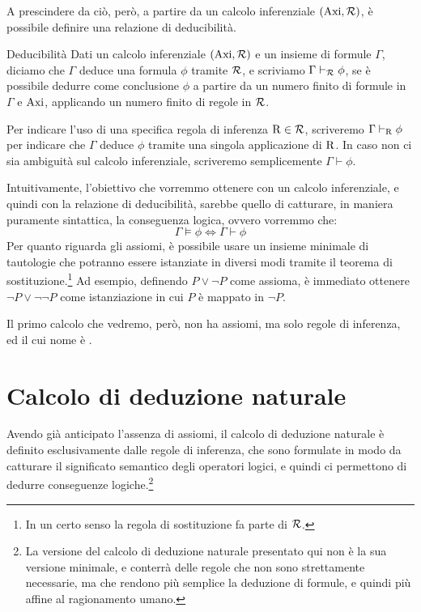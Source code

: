 A prescindere da ciò, però, a partire da un calcolo inferenziale \((\operatorname{Axi}, \mathcal{R})\), è possibile definire una relazione di deducibilità.

\begin{definition}[namedlabel={def:deducibility}{Deducibilità}]{Deducibilità}
  Dati un calcolo inferenziale \((\operatorname{Axi}, \mathcal{R})\) e un insieme di formule \(\Gamma\), diciamo che \(\Gamma\) deduce una formula \(\phi\) tramite \(\mathcal{R}\), e scriviamo \(\Gamma \vdash_{\mathcal{R}} \phi\), se è possibile dedurre come conclusione \(\phi\) a partire da un numero finito di formule in \(\Gamma\) e \(\operatorname{Axi}\), applicando un numero finito di regole in \(\mathcal{R}\).

  Per indicare l'uso di una specifica regola di inferenza \(\operatorname{R} \in \mathcal{R}\), scriveremo \(\Gamma \vdash_{\operatorname{R}} \phi\) per indicare che \(\Gamma\) deduce \(\phi\) tramite una singola applicazione di \(\operatorname{R}\).
  In caso non ci sia ambiguità sul calcolo inferenziale, scriveremo semplicemente \(\Gamma \vdash \phi\).
\end{definition}

Intuitivamente, l'obiettivo che vorremmo ottenere con un calcolo inferenziale, e quindi con la relazione di deducibilità, sarebbe quello di catturare, in maniera puramente sintattica, la conseguenza logica, ovvero vorremmo che:
\[\Gamma \models \phi \iff \Gamma \vdash \phi\]
Per quanto riguarda gli assiomi, è possibile usare un insieme minimale di tautologie che potranno essere istanziate in diversi modi tramite il teorema di sostituzione.\footnote{In un certo senso la regola di sostituzione fa parte di \(\mathcal{R}\).}
Ad esempio, definendo \(P \lor \neg P\) come assioma, è immediato ottenere \(\lnot P \lor \lnot \lnot P\) come istanziazione in cui \(P\) è mappato in \(\lnot P\).

Il primo calcolo che vedremo, però, non ha assiomi, ma solo regole di inferenza, ed il cui nome è .

\section{Calcolo di deduzione naturale}

Avendo già anticipato l'assenza di assiomi, il calcolo di deduzione naturale è definito esclusivamente dalle regole di inferenza, che sono formulate in modo da catturare il significato semantico degli operatori logici, e quindi ci permettono di dedurre conseguenze logiche.\footnote{
  La versione del calcolo di deduzione naturale presentato qui non è la sua versione minimale, e conterrà delle regole che non sono strettamente necessarie, ma che rendono più semplice la deduzione di formule, e quindi più affine al ragionamento umano.}

